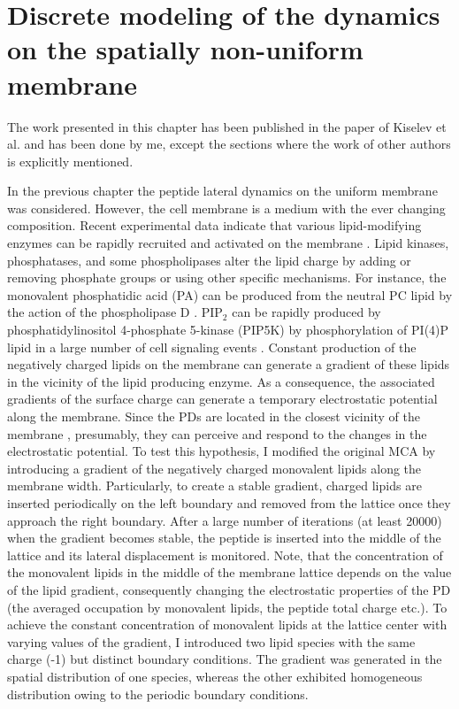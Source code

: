 \chapter{Discrete modeling of the dynamics on the spatially non-uniform membrane}

\label{non_uniform_membrane}

The work presented in this chapter has been published in the paper of Kiselev et al. \cite{Kiselev2011} and has been done by me, except the sections where the work of other authors is explicitly mentioned.

In the previous chapter the peptide lateral dynamics on the uniform membrane was considered. However, the cell membrane is a medium with the ever changing composition. Recent experimental data indicate that various lipid-modifying enzymes can be rapidly recruited and activated on the membrane \cite{Brown1998,Chatah2001}. Lipid kinases, phosphatases, and some phospholipases alter the lipid charge by adding or removing phosphate groups or using other specific mechanisms. For instance, the monovalent phosphatidic acid (PA) can be produced from the neutral PC lipid by the action of the phospholipase D \cite{Cazzolli2006,Rizzo2002}. PIP$_2$ can be rapidly produced by phosphatidylinositol 4-phosphate 5-kinase (PIP5K) by phosphorylation of PI(4)P lipid in a large number of cell signaling events \cite{Bout2009,Kwiatkowska2010a}. Constant production of the negatively charged lipids on the membrane can generate a gradient of these lipids in the vicinity of the lipid producing enzyme. As a consequence, the associated gradients of the surface charge can generate a temporary electrostatic potential along the membrane. Since the PDs are located in the closest vicinity of the membrane \cite{Ben-Tal1996}, presumably, they can perceive and respond to the changes in the electrostatic potential. To test this hypothesis, I modified the original MCA by introducing a gradient of the negatively charged monovalent lipids along the membrane width. Particularly, to create a stable gradient, charged lipids are inserted periodically on the left boundary and removed from the lattice once they approach the right boundary. After a large number of iterations (at least 20000) when the gradient becomes stable, the peptide is inserted into the middle of the lattice and its lateral displacement is monitored. Note, that the concentration of the monovalent lipids in the middle of the membrane lattice depends on the value of the lipid gradient, consequently changing the electrostatic properties of the PD (the averaged occupation by monovalent lipids, the peptide total charge etc.). To achieve the constant concentration of monovalent lipids at the lattice center with varying values of the gradient, I introduced two lipid species with the same charge (-1) but distinct boundary conditions. The gradient was generated in the spatial distribution of one species, whereas the other exhibited homogeneous distribution owing to the periodic boundary conditions.

